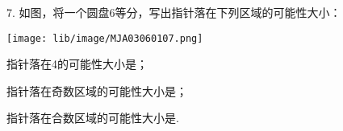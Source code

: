 7.	如图，将一个圆盘6等分，写出指针落在下列区域的可能性大小：

\begin{center}

    \texttt{[image: lib/image/MJA03060107.png]}

\end{center}

\begin{subquestions}

    \subquestion 指针落在4的可能性大小是\key{\hspace{2cm}}；

    \subquestion 指针落在奇数区域的可能性大小是\key{\hspace{2cm}}；

    \subquestion 指针落在合数区域的可能性大小是\key{\hspace{2cm}}.    

\end{subquestions}



